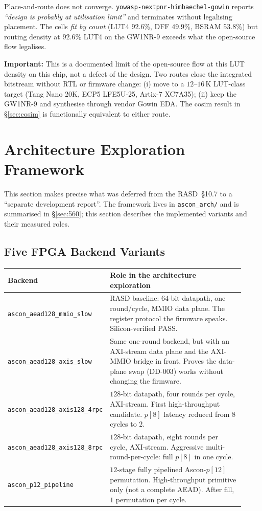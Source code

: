 \documentclass[11pt,a4paper]{article}
\newcommand{\warn}[1]{%
  \begin{tcolorbox}[
    enhanced, colback=warnbg, colframe=warnframe,
    arc=2pt, boxrule=0.5pt, left=6pt, right=6pt, top=3pt, bottom=3pt,
    before upper={\small}
  ]
  \textbf{\color{warnframe}Important:} #1
  \end{tcolorbox}\vspace{3pt}}
\begin{document}
Place-and-route does not converge.
\texttt{yowasp-nextpnr-himbaechel-gowin} reports \emph{``design is
probably at utilisation limit''} and terminates without legalising
placement. The cells \emph{fit by count} (LUT4 $92.6\%$, DFF $49.9\%$,
BSRAM $53.8\%$) but routing density at $92.6\%$ LUT4 on the GW1NR-9
exceeds what the open-source flow legalises.

\warn{This is a documented limit of the open-source flow at this LUT
density on this chip, not a defect of the design. Two routes close the
integrated bitstream without RTL or firmware change: (i) move to a
$12$--$16$\,K LUT-class target (Tang Nano 20K, ECP5 LFE5U-25, Artix-7
XC7A35); (ii) keep the GW1NR-9 and synthesise through vendor Gowin EDA.
The cosim result in §\ref{sec:cosim} is functionally equivalent to
either route.}

\section{Architecture Exploration Framework}
\label{sec:archexp}

This section makes precise what was deferred from the RASD~§10.7 to a
``separate development report''. The framework lives in
\texttt{ascon\_arch/} and is summarised in §\ref{sec:560}; this section
describes the implemented variants and their measured roles.

\subsection{Five FPGA Backend Variants}

\begin{center}
\begin{longtable}{p{0.30\linewidth}p{0.62\linewidth}}
\toprule
\rowcolor{tabhead!20}\textbf{Backend} & \textbf{Role in the architecture exploration}\\
\midrule
\texttt{ascon\_aead128\_mmio\_slow} &
RASD baseline: $64$-bit datapath, one round/cycle, MMIO data plane. The
register protocol the firmware speaks. Silicon-verified PASS.\\
\midrule
\texttt{ascon\_aead128\_axis\_slow} &
Same one-round backend, but with an AXI-stream data plane and the
AXI-MMIO bridge in front. Proves the data-plane swap (DD-003) works
without changing the firmware.\\
\midrule
\texttt{ascon\_aead128\_axis128\_4rpc} &
$128$-bit datapath, four rounds per cycle, AXI-stream. First
high-throughput candidate. $p[8]$ latency reduced from $8$ cycles to $2$.\\
\midrule
\texttt{ascon\_aead128\_axis128\_8rpc} &
$128$-bit datapath, eight rounds per cycle, AXI-stream. Aggressive
multi-round-per-cycle: full $p[8]$ in one cycle.\\
\midrule
\texttt{ascon\_p12\_pipeline} &
$12$-stage fully pipelined Ascon-$p[12]$ permutation. High-throughput
primitive only (not a complete AEAD). After fill, $1$ permutation per
cycle.\\
\bottomrule
\end{longtable}
\end{center}
\end{document}
